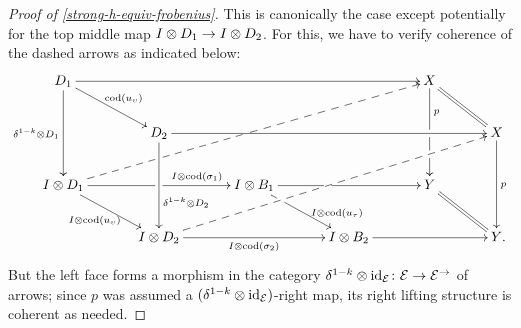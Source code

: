 \documentclass[reqno,10pt,a4paper,oneside,draft]{amsart}
\begin{document}
\begin{proof}[Proof of \cref{strong-h-equiv-frobenius}]
This is canonically the case except potentially for the top middle map $I \otimes D_1 \to I \otimes D_2$.
For this, we have to verify coherence of the dashed arrows as indicated below:
\[
\xymatrix@C+1em{
  D_1
  \ar[rrrr]
  \ar[dd]_{\kcylinv \otimes D_1}
  \ar[dr]^{\cod(u_{\upsilon})}
&&&&
  X
  \ar[dd]^(0.3){p}|!{[dlll];[dr]}{\hole}|!{[dddlll];[dr]}{\hole}
  \ar@{=}[dr]
\\&
  D_2
  \ar[rrrr]
  \ar[dd]^(0.66){\kcylinv \otimes D_2}
&&&&
  X
  \ar[dd]^{p}
\\
  \interval \otimes D_1
  \ar[rr]^(0.7){I \otimes \cod(\sigma_1)}|!{[ur];[dr]}{\hole}
  \ar@{-->}[uurrrr]|!{[ur];[dr]}{\hole}|!{[ur];[urrrrr]}{\hole} %
  \ar[dr]_{I \otimes \cod(u_{\upsilon})}
&&
  \interval \otimes B_1
  \ar[rr]|!{[dl];[urrr]}{\hole}
  \ar[dr]^(0.7){\interval \otimes \cod(u_\tau)}|!{[dl];[urrr]}{\hole}
&&
  Y
  \ar@{=}[dr]
\\&
  \interval \otimes D_2
  \ar[rr]_{I \otimes \cod(\sigma_2)}
  \ar@{-->}[uurrrr]
&&
  \interval \otimes B_2
  \ar[rr]
&&
  Y
\rlap{.}}
\]
But the left face forms a morphism in the category $\delta^{1-k} \otimes \operatorname{id}_{\mathcal{E}} \colon \mathcal{E} \to \mathcal{E}^\to$ of arrows; since $p$ was assumed a $(\delta^{1-k} \otimes \operatorname{id}_{\mathcal{E}})$-right map, its right lifting structure is coherent as needed.
\end{proof}
\end{document}
